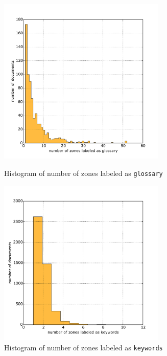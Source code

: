 \begin{figure}
\centering
\begin{minipage}[t!]{0.48\linewidth}
  \includegraphics[width=8cm]{plots/glossary_histogram}
  \caption{Histogram of number of zones labeled as \texttt{glossary}}
  \label{fig:glossary_histogram}
\end{minipage}
\quad
\begin{minipage}[t!]{0.48\linewidth}
  \includegraphics[width=8cm]{plots/keywords_histogram}
  \caption{Histogram of number of zones labeled as \texttt{keywords}}
  \label{fig:keywords_histogram}
\end{minipage}
\end{figure}

